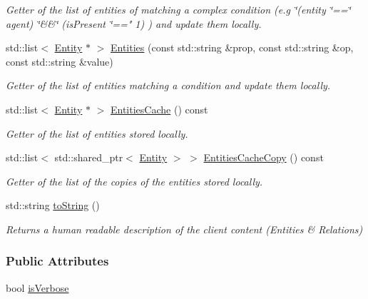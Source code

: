 \begin{DoxyCompactItemize}
\begin{DoxyCompactList}\small\item\em Getter of the list of entities of matching a complex condition (e.\+g \char`\"{}(entity \char`\"{}==\char`\"{} agent) \char`\"{}\&\&\char`\"{} (is\+Present \char`\"{}==" 1) ) and update them locally. \end{DoxyCompactList}\item 
std\+::list$<$ \hyperlink{group__icubclient__representations_classicubclient_1_1Entity}{Entity} $\ast$ $>$ \hyperlink{group__icubclient__clients_a62ac8158ffa1f9d4d33ea15ea5403a15}{Entities} (const std\+::string \&prop, const std\+::string \&op, const std\+::string \&value)
\begin{DoxyCompactList}\small\item\em Getter of the list of entities matching a condition and update them locally. \end{DoxyCompactList}\item 
std\+::list$<$ \hyperlink{group__icubclient__representations_classicubclient_1_1Entity}{Entity} $\ast$ $>$ \hyperlink{group__icubclient__clients_af92d4219221c7705bf70779bcde33768}{Entities\+Cache} () const
\begin{DoxyCompactList}\small\item\em Getter of the list of entities stored locally. \end{DoxyCompactList}\item 
std\+::list$<$ std\+::shared\+\_\+ptr$<$ \hyperlink{group__icubclient__representations_classicubclient_1_1Entity}{Entity} $>$ $>$ \hyperlink{group__icubclient__clients_a9e33c7aaf762eea9123b90565812e04c}{Entities\+Cache\+Copy} () const
\begin{DoxyCompactList}\small\item\em Getter of the list of the copies of the entities stored locally. \end{DoxyCompactList}\item 
std\+::string \hyperlink{group__icubclient__clients_a46da9e7f9ba02ae088fe210d6e52bcee}{to\+String} ()
\begin{DoxyCompactList}\small\item\em Returns a human readable description of the client content (Entities \& Relations) \end{DoxyCompactList}\end{DoxyCompactItemize}
\subsubsection*{Public Attributes}
\begin{DoxyCompactItemize}
\item 
bool \hyperlink{group__icubclient__clients_ae9916c9f9f313c49ea22be20c4570a7a}{is\+Verbose}
\end{DoxyCompactItemize}
